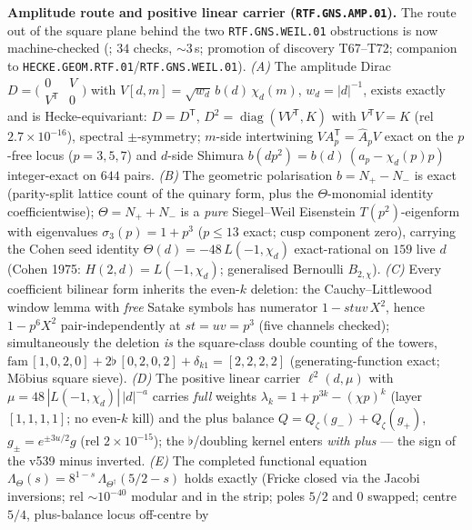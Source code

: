 \documentclass[11pt,a4paper]{article}
\theoremstyle{definition}
\begin{document}
\par\smallskip\noindent\textbf{Amplitude route and positive linear carrier
(\texttt{RTF.GNS.AMP.01}).}
The route out of the square plane behind the two \texttt{RTF.GNS.WEIL.01}
obstructions is now machine-checked
(; $34$ checks, $\sim3$\,s; promotion of
discovery T67--T72; companion to
\texttt{HECKE.GEOM.RTF.01}/\texttt{RTF.GNS.WEIL.01}).
\emph{(A)} The amplitude Dirac
$D=\bigl(\begin{smallmatrix}0&V\\V^{\mathsf T}&0\end{smallmatrix}\bigr)$ with
$V[d,m]=\sqrt{w_d}\,b(d)\,\chi_d(m)$, $w_d=|d|^{-1}$, exists exactly and is
Hecke-equivariant: $D=D^{\mathsf T}$,
$D^2=\operatorname{diag}(VV^{\mathsf T},K)$ with $V^{\mathsf T}V=K$
(rel $2.7\times10^{-16}$), spectral $\pm$-symmetry; $m$-side intertwining
$VA_p^{\mathsf T}=\hat A_pV$ exact on the $p$-free locus ($p=3,5,7$) and $d$-side
Shimura $b(dp^2)=b(d)\,(a_p-\chi_d(p)p)$ integer-exact on $644$ pairs.
\emph{(B)} The geometric polarisation $b=N_+-N_-$ is exact (parity-split lattice
count of the quinary form, plus the $\Theta$-monomial identity coefficientwise);
$\Theta=N_++N_-$ is a \emph{pure} Siegel--Weil Eisenstein $T(p^2)$-eigenform with
eigenvalues $\sigma_3(p)=1+p^3$ ($p\le13$ exact; cusp component zero), carrying the
Cohen seed identity $\Theta(d)=-48\,L(-1,\chi_d)$ exact-rational on $159$ live $d$
(Cohen 1975: $H(2,d)=L(-1,\chi_d)$; generalised Bernoulli $B_{2,\chi}$).
\emph{(C)} Every coefficient bilinear form inherits the even-$k$ deletion: the
Cauchy--Littlewood window lemma with \emph{free} Satake symbols has numerator
$1-stuv\,X^2$, hence $1-p^6X^2$ pair-independently at $st=uv=p^3$ (five channels
checked); simultaneously the deletion \emph{is} the square-class double counting of
the towers, $\mathrm{fam}\,[1,0,2,0]+2\flat\,[0,2,0,2]+\delta_{k1}=[2,2,2,2]$
(generating-function exact; M\"obius square sieve).
\emph{(D)} The positive linear carrier $\ell^2(d,\mu)$ with
$\mu=48\,|L(-1,\chi_d)|\,|d|^{-a}$ carries \emph{full} weights
$\lambda_k=1+p^{3k}-(\chi p)^k$ (layer $[1,1,1,1]$; no even-$k$ kill) and the plus
balance $Q=Q_\zeta(g_-)+Q_\zeta(g_+)$, $g_\pm=e^{\pm3u/2}g$
(rel $2\times10^{-15}$); the $\flat$/doubling kernel enters \emph{with plus} ---
the sign of the v539 minus inverted.
\emph{(E)} The completed functional equation
$\Lambda_\Theta(s)=8^{1-s}\,\Lambda_{\Theta^\dagger}(5/2-s)$ holds exactly
(Fricke closed via the Jacobi inversions; rel $\sim10^{-40}$ modular and in the
strip; poles $5/2$ and $0$ swapped; centre $5/4$, plus-balance locus off-centre by
\end{document}
